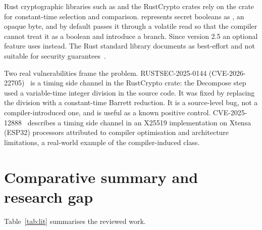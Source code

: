 Rust cryptographic libraries such as  and the RustCrypto crates rely on the  crate~\cite{subtle} for constant-time selection and comparison.  represents secret booleans as , an opaque byte, and by default passes it through a volatile read so that the compiler cannot treat it as a boolean and introduce a branch. Since version 2.5 an optional feature uses  instead. The Rust standard library documents  as best-effort and not suitable for security guarantees~\cite{blackbox}.

Two real vulnerabilities frame the problem. RUSTSEC-2025-0144 (CVE-2026-22705)~\cite{rustsec2025_0144} is a timing side channel in the RustCrypto  crate: the Decompose step used a variable-time integer division in the source code. It was fixed by replacing the division with a constant-time Barrett reduction. It is a source-level bug, not a compiler-introduced one, and is useful as a known positive control. CVE-2025-12888~\cite{cve2025_12888} describes a timing side channel in an X25519 implementation on Xtensa (ESP32) processors attributed to compiler optimisation and architecture limitations, a real-world example of the compiler-induced class.

\section{Comparative summary and research gap}
\label{sec:lit_gap}

Table~\ref{tab:lit} summarises the reviewed work.

